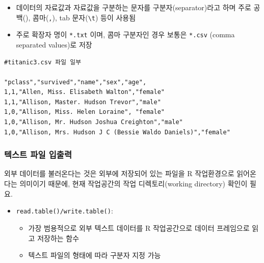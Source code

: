 \documentclass[
  11pt,
]{krantz}
\providecommand{\tightlist}{%
  \setlength{\itemsep}{0pt}\setlength{\parskip}{0pt}}
\let\BeginKnitrBlock\begin \let\EndKnitrBlock\end
\begin{document}
\begin{itemize}
\tightlist
\item
  데이터의 자료값과 자료값을 구분하는 문자를 구분자(separator)라고 하며 주로 공백(\texttt{}), 콤마(\texttt{,}), tab 문자(\texttt{\textbackslash{}t}) 등이 사용됨
\item
  주로 확장자 명이 \texttt{*.txt} 이며, 콤마 구분자인 경우 보통은 \texttt{*.csv} (comma separated values)로 저장
\end{itemize}

\begin{verbatim}
#titanic3.csv 파일 일부 

"pclass","survived","name","sex","age",
1,1,"Allen, Miss. Elisabeth Walton","female"
1,1,"Allison, Master. Hudson Trevor","male"
1,0,"Allison, Miss. Helen Loraine", "female"
1,0,"Allison, Mr. Hudson Joshua Creighton","male"
1,0,"Allison, Mrs. Hudson J C (Bessie Waldo Daniels)","female"
\end{verbatim}

\hypertarget{text-import-export}{%
\subsubsection*{\texorpdfstring{\textbf{텍스트 파일 입출력}}{텍스트 파일 입출력}}\label{text-import-export}}


\footnotesize

\BeginKnitrBlock{rmdcaution}
외부 데이터를 불러온다는 것은 외부에 저장되어 있는 파일을 R 작업환경으로 읽어온다는 의미이기 때문에, 현재 작업공간의 작업 디렉토리(working directory) 확인이 필요.
\EndKnitrBlock{rmdcaution}

\normalsize

\begin{itemize}
\tightlist
\item
  \texttt{read.table()/write.table()}:

  \begin{itemize}
  \tightlist
  \item
    가장 범용적으로 외부 텍스트 데이터를 R 작업공간으로 데이터 프레임으로 읽고 저장하는 함수
  \item
    텍스트 파일의 형태에 따라 구분자 지정 가능
  \end{itemize}
\end{itemize}

\footnotesize
\end{document}
